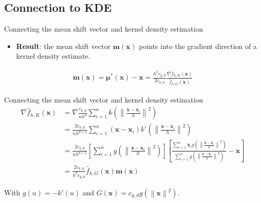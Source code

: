 \documentclass[18pt]{beamer}
\newcommand{\norm}[1]{\left\lVert#1\right\rVert}
\begin{document}
\subsection{Connection to KDE}

\begin{frame}{Connecting the mean shift vector and kernel density estimation}
	\begin{itemize}
		\item \textbf{Result}: the mean shift vector $\bm{m}(\bm{x})$ points into the gradient direction of a kernel density estimate. 
	\end{itemize}
	\begin{align*}
		\bm{m}(\bm{x}) = \bm{\mu}^*(\bm{x}) - \bm{x} = \frac{h^2c_{g,d}}{2c_{k,d}} \frac{\nabla \hat{f}_{h,K}(\bm{x})}{\hat{f}_{h,G}(\bm{x})}
	\end{align*}
\end{frame}

\begin{frame}{Connecting the mean shift vector and kernel density estimation}
	\begin{align*}
		\nabla \hat{f}_{h,K}(\bm{x}) &= \nabla \frac{c_{k,d}}{nh^d} \sum_{i=1}^n k\left(\norm{\frac{\bm{x} - \bm{x}_i}{h}}^2 \right)\\
		&= \frac{2c_{k,d}}{nh^{d+2}} \sum_{i=1}^n (\bm{x} - \bm{x}_i)k'\left(\norm{\frac{\bm{x} - \bm{x}_i}{h}}^2 \right)\\
		&= \frac{2c_{k,d}}{nh^{d+2}} \left[\sum_{i=1}^n g\left(\norm{\frac{\bm{x} - \bm{x}_i}{h}}^2 \right)\right] \left[\frac{\sum_{i=1}^n \bm{x}_i g\left(\norm{\frac{\bm{x} - \bm{x}_i}{h}}^2 \right)}{\sum_{i=1}^n g\left(\norm{\frac{\bm{x} - \bm{x}_i}{h}}^2 \right)} - \bm{x}\right]\\
		&= \frac{2c_{k,d}}{h^2c_{g,d}} \hat{f}_{h,G}(\bm{x}) \bm{m}(\bm{x})
	\end{align*}
	
	With $g(u) = -k'(u)$ and $G(\bm{x}) = c_{g,d} g(\norm{\bm{x}}^2)$.
\end{frame}
\end{document}
